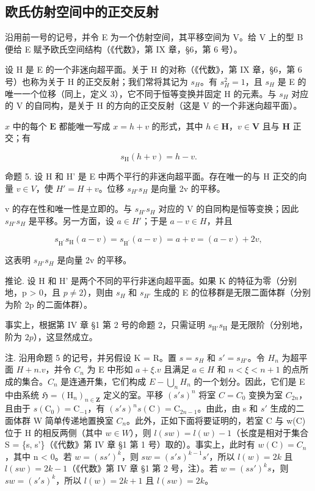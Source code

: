 \subsection{欧氏仿射空间中的正交反射}

沿用前一号的记号，并令 E 为一个仿射空间，其平移空间为 V。给 V 上的型 B 便给 E 赋予欧氏空间结构（《代数》，第 IX 章，§6，第 6 号）。

设 H 是 E 的一个非迷向超平面。关于 H 的对称（《代数》，第 IX 章，§6，第 6 号）也称为关于 H 的正交反射；我们常将其记为 \(s_{H}\)。有 \(s_{H}^{2}=1\)，且 \(s_{H}\) 是 E 的唯一一个位移（同上，定义 3），它不同于恒等变换并固定 H 的元素。与 \(s_{H}\) 对应的 V 的自同构，是关于 H 的方向的正交反射（这是 V 的一个非迷向超平面）。

\(x\) 中的每个 \(\mathbf{E}\) 都能唯一写成 \(x = h + v\) 的形式，其中 \(h \in \mathbf{H}\)，\(v \in \mathbf{V}\) 且与 \(\mathbf{H}\) 正交；有

\[
s _ {\mathrm{H}} (h + v) = h - v.
\]

命题 5. 设 H 和 H' 是 E 中两个平行的非迷向超平面。存在唯一的与 H 正交的向量 \(v \in V\)，使 \(H' = H + v\)。位移 \(s_{H'} s_{H}\) 是向量 2v 的平移。

v 的存在性和唯一性是立即的。与 \(s_{H'}s_{H}\) 对应的 V 的自同构是恒等变换；因此 \(s_{H'}s_{H}\) 是平移。另一方面，设 \(a \in H'\)；于是 \(a - v \in H\)，并且

\[
s _ {\mathrm {H^ {\prime}}} s _ {\mathrm{H}} (a - v) = s _ {\mathrm {H^ {\prime}}} (a - v) = a + v = (a - v) + 2 v,
\]

这表明 \(s_{H'}s_{H}\) 是向量 2v 的平移。

推论. 设 H 和 H' 是两个不同的平行非迷向超平面。如果 K 的特征为零（分别地，p \textgreater{} 0，且 \(p \neq 2\)），则由 \(s_{H}\) 和 \(s_{H'}\) 生成的 E 的位移群是无限二面体群（分别为阶 2p 的二面体群）。

事实上，根据第 IV 章 §1 第 2 号的命题 2，只需证明 \(s_{\mathrm{H}'}s_{\mathrm{H}}\) 是无限阶（分别地，阶为 \(2p\)），这显然成立。

注. 沿用命题 5 的记号，并另假设 K = R。置 \(s = s_{H}\) 和 \(s' = s_{H'}\)。令 \(H_{n}\) 为超平面 \(H + n.v\)，并令 \(C_{n}\) 为 E 中形如 \(a + \xi.v\) 且满足 \(a \in H\) 和 \(n < \xi < n + 1\) 的点所成的集合。\(C_{n}\) 是连通开集，它们构成 \(E - \bigcup_{n} H_{n}\) 的一个划分。因此，它们是 E 中由系统 \(\mathfrak{H} = (\mathrm{H}_{n})_{n \in \mathbf{Z}}\) 定义的室。平移 \((s's)^{n}\) 将室 \(C = C_{0}\) 变换为室 \(C_{2n}\)，且由于 \(s(\mathrm{C}_{0}) = \mathrm{C}_{-1}\)，有 \((s's)^{n}s(\mathrm{C}) = \mathrm{C}_{2n-1}\)。由此，由 s 和 \(s'\) 生成的二面体群 W 简单传递地置换室 \(C_{n}\)。此外，正如下面将要证明的，若室 C 与 w(C) 位于 H 的相反两侧（其中 \(w \in W\)），则 \(l(sw) = l(w) - 1\)（长度是相对于集合 S = \{s, s'\}（《代数》第 IV 章 §1 第 1 号）取的）。事实上，此时有 \(w(\mathrm{C}) = C_{n}\)，其中 n \textless{} 0。若 \(w = (ss')^{k}\)，则 \(sw = (s's)^{k-1}s'\)，所以 \(l(w) = 2k\) 且 \(l(sw) = 2k - 1\)（《代数》第 IV 章 §1 第 2 号，注）。若 \(w = (ss')^{k}s\)，则 \(sw = (s's)^{k}\)，所以 \(l(w) = 2k + 1\) 且 \(l(sw) = 2k\)。

